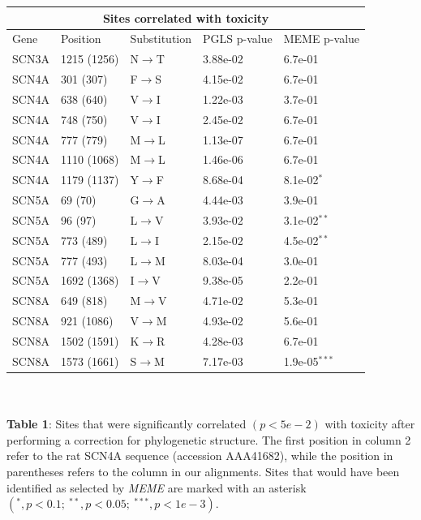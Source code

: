 \documentclass{article}
\begin{document}
\begin{table}
\centering
\begin{tabular}{ |p{3cm}||p{3cm}|p{3cm}|p{3cm}|p{3cm}|  }
 \hline
 \multicolumn{5}{|c|}{Sites correlated with toxicity} \\
 \hline
 Gene & Position & Substitution & PGLS p-value & MEME p-value \\
 \hline
       SCN3A & 1215 (1256) & N$\rightarrow$T & 3.88e-02  & 6.7e-01 \\
     SCN4A  & 301 (307) & F$\rightarrow$S & 4.15e-02 & 6.7e-01 \\
    SCN4A  & 638 (640) & V$\rightarrow$I & 1.22e-03 & 3.7e-01 \\
    SCN4A  & 748 (750) & V$\rightarrow$I & 2.45e-02 & 6.7e-01\\
    SCN4A &  777 (779) & M$\rightarrow$L & 1.13e-07 & 6.7e-01\\
    SCN4A & 1110 (1068) & M$\rightarrow$L & 1.46e-06 & 6.7e-01\\
     SCN4A & 1179 (1137) & Y$\rightarrow$F & 8.68e-04 & 8.1e-02$^{*}$\\
     SCN5A  & 69 (70) & G$\rightarrow$A & 4.44e-03 & 3.9e-01 \\
     SCN5A  & 96 (97) & L$\rightarrow$V & 3.93e-02 & 3.1e-02$^{**}$\\
     SCN5A  & 773 (489) & L$\rightarrow$I & 2.15e-02 & 4.5e-02$^{**}$ \\
    SCN5A & 777 (493) & L$\rightarrow$M & 8.03e-04 & 3.0e-01\\
    SCN5A & 1692 (1368) & I$\rightarrow$V & 9.38e-05 & 2.2e-01\\
    SCN8A & 649 (818) & M$\rightarrow$V & 4.71e-02 & 5.3e-01\\
    SCN8A & 921 (1086) & V$\rightarrow$M & 4.93e-02 & 5.6e-01\\ %
    SCN8A & 1502 (1591) & K$\rightarrow$R & 4.28e-03 & 6.7e-01\\
    SCN8A & 1573 (1661) & S$\rightarrow$M & 7.17e-03 & 1.9e-05$^{***}$\\
 \hline
\end{tabular}
\end{table}~\\~\\
\textbf{Table 1}: {Sites that were significantly correlated $(p<5e-2)$ with toxicity after performing a correction for phylogenetic structure. The first position in column 2 refer to the rat SCN4A sequence (accession AAA41682), while the position in parentheses refers to the column in our alignments. Sites that would have been identified as selected by \textit{MEME} are marked with an asterisk $(^*, p<0.1;\ ^{**}, p<0.05;\ ^{***}, p<1e-3)$}.
\clearpage
\end{document}
